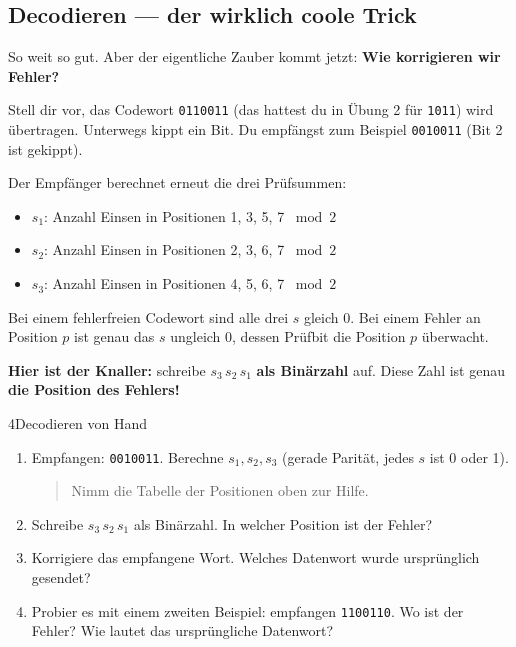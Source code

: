 \subsection*{Decodieren — der wirklich coole Trick}

So weit so gut. Aber der eigentliche Zauber kommt jetzt: \textbf{Wie
korrigieren wir Fehler?}

Stell dir vor, das Codewort \texttt{0110011} (das hattest du in
Übung 2 für \texttt{1011}) wird übertragen. Unterwegs kippt ein Bit.
Du empfängst zum Beispiel \texttt{0010011} (Bit 2 ist gekippt).

Der Empfänger berechnet erneut die drei Prüfsummen:

\begin{itemize}
\item $s_1$: Anzahl Einsen in Positionen 1, 3, 5, 7 $\bmod 2$
\item $s_2$: Anzahl Einsen in Positionen 2, 3, 6, 7 $\bmod 2$
\item $s_3$: Anzahl Einsen in Positionen 4, 5, 6, 7 $\bmod 2$
\end{itemize}

Bei einem fehlerfreien Codewort sind alle drei $s$ gleich 0. Bei einem
Fehler an Position $p$ ist genau das $s$ ungleich 0, dessen Prüfbit
die Position $p$ überwacht.

\textbf{Hier ist der Knaller:} schreibe $s_3\, s_2\, s_1$ \textbf{als
Binärzahl} auf. Diese Zahl ist genau \textbf{die Position des
Fehlers!}

\begin{bleistiftuebung}{4}{Decodieren von Hand}
\begin{enumerate}[label=(\alph*), leftmargin=*]
\item Empfangen: \texttt{0010011}. Berechne $s_1, s_2, s_3$ (gerade
  Parität, jedes $s$ ist 0 oder 1).

  \begin{quote}
  Nimm die Tabelle der Positionen oben zur Hilfe.
  \end{quote}

\item Schreibe $s_3\, s_2\, s_1$ als Binärzahl. In welcher Position
  ist der Fehler?

\item Korrigiere das empfangene Wort. Welches Datenwort wurde
  ursprünglich gesendet?

\item Probier es mit einem zweiten Beispiel: empfangen \texttt{1100110}.
  Wo ist der Fehler? Wie lautet das ursprüngliche Datenwort?
\end{enumerate}
\end{bleistiftuebung}

